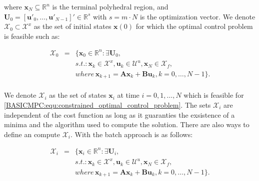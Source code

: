     where $\textbf{x}_N\subseteq\mathbb{R}^n$ is the terminal polyhedral region, and $\textbf{U}_0=[\textbf{u}'_0,\dots,\textbf{u}'_{N-1}]'\in\mathbb{R}^s$ with $s=m\cdot N$ is the optimization vector. We denote $\mathcal{X}_0\subset\mathcal{X}^x$ as the set of initial states $\textbf{x}(0)$ for which the optimal control problem is feasible such as:

    \begin{equation}
        \begin{array}{rcl}
            \mathcal{X}_0&=&\{
            \textbf{x}_0\in\mathbb{R}^n:\exists\textbf{U}_0,\\
            &&s.t.:\textbf{x}_k\in\mathcal{X}^x,\textbf{u}_k\in\mathcal{U}^u,\textbf{x}_N\in\mathcal{X}_f,\\
            &&where\,\textbf{x}_{k+1}=\textbf{Ax}_{k}+\textbf{Bu}_{k},k=0,\dots,N-1
            \}.\\
        \end{array}
        \label{BASICMPC:equ:constrained_initial_set}
    \end{equation}

    We denote $\mathcal{X}_i$ as the set of states $\textbf{x}_i$ at time $i=0,1,\dots,N$ which is feasible for \ref{BASICMPC:equ:constrained_optimal_control_problem}. The sets $\mathcal{X}_i$ are independent of the cost function as long as it guaranties the exsistence of a minima and the algorithm used to compute the solution. There are also ways to define an compute $\mathcal{X}_i$. With the batch approach is as follows:

    \begin{equation}
        \begin{array}{rcl}
            \mathcal{X}_i&=&\{
            \textbf{x}_i\in\mathbb{R}^n:\exists\textbf{U}_i,\\
            &&s.t.:\textbf{x}_k\in\mathcal{X}^x,\textbf{u}_k\in\mathcal{U}^u,\textbf{x}_N\in\mathcal{X}_f,\\
            &&where\,\textbf{x}_{k+1}=\textbf{Ax}_{k}+\textbf{Bu}_{k},k=0,\dots,N-1
            \}.\\
        \end{array}
        \label{BASICMPC:equ:constrained_feasible_set}
    \end{equation}

